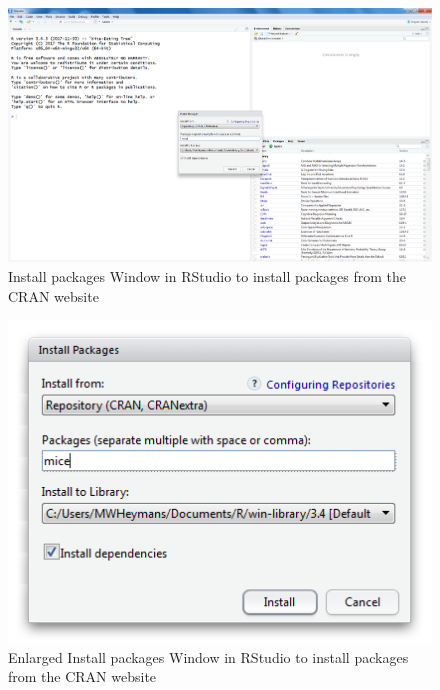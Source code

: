 \documentclass[]{book}
\theoremstyle{definition}
\theoremstyle{definition}
\theoremstyle{definition}
\theoremstyle{remark}
\begin{document}
\begin{figure}

{\centering \includegraphics[width=0.9\linewidth]{images/fig1.25} 

}

\caption{Install packages Window in RStudio to install packages from the CRAN website}\label{fig:fig25}
\end{figure}

\begin{figure}

{\centering \includegraphics[width=0.9\linewidth]{images/fig1.25b} 

}

\caption{Enlarged Install packages Window in RStudio to install packages from the CRAN website}\label{fig:fig25b}
\end{figure}
\end{document}
